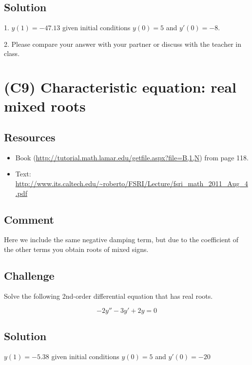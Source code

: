 \subsection*{Solution}
1. $y(1) = -47.13$ given initial conditions $y(0)=5$ and $y'(0)=-8$.

2. Please compare your answer with your partner or discuss with the teacher in class.




\newpage
\section{(C9) Characteristic equation: real mixed roots}

\subsection*{Resources}
\begin{itemize}
    \item Book (\url{http://tutorial.math.lamar.edu/getfile.aspx?file=B,1,N}) from page 118.
    \item Text: \url{http://www.its.caltech.edu/~roberto/FSRI/Lecture/fsri_math_2011_Aug_4.pdf}
\end{itemize}

\subsection*{Comment}
Here we include the same negative damping term, but due to the coefficient of the other terms you obtain roots of mixed signs.

\subsection*{Challenge}
Solve the following 2nd-order differential equation that has real roots. 

\begin{equation}
    -2 y'' - 3 y' + 2 y = 0
\end{equation}

\subsection*{Solution}
$y(1) = -5.38$ given initial conditions $y(0)=5$ and $y'(0)=-20$




\newpage
